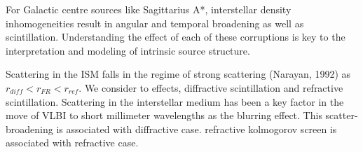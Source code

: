  For Galactic centre sources like Sagittarius A*, interstellar density inhomogeneities result in angular and temporal broadening as well as scintillation. Understanding the effect of each of these corruptions is key to the interpretation and modeling of intrinsic source structure. 

Scattering in the ISM falls in the regime of strong scattering (Narayan, 1992) as $r_{diff} < r_{FR} < r_{ref} $. We consider to effects, diffractive scintillation and refractive scintillation. Scattering in the interstellar medium has been a key factor in the move of VLBI to short millimeter wavelengths as the blurring effect. This scatter-broadening is associated with diffractive case. 
refractive kolmogorov screen is associated with refractive case. 




